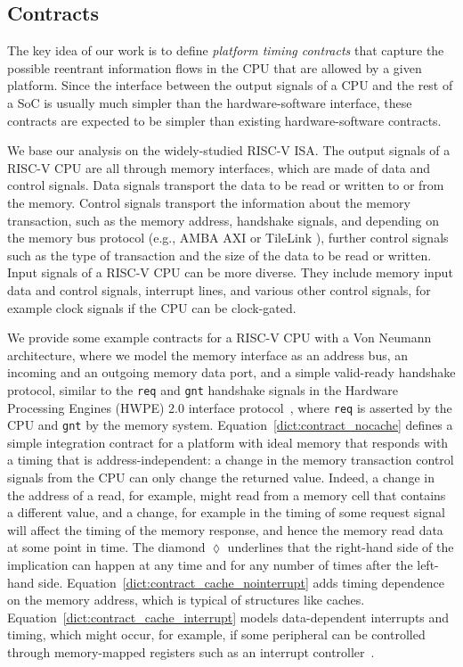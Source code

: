 \subsection{Contracts}

The key idea of our work is to define \emph{platform timing contracts} that capture the possible reentrant information flows in the CPU that are allowed by a given platform.
Since the interface between the output signals of a CPU and the rest of a SoC is usually much simpler than the hardware-software interface, these contracts are expected to be simpler than existing hardware-software contracts.

We base our analysis on the widely-studied RISC-V ISA.
The output signals of a RISC-V CPU are all through memory interfaces, which are made of data and control signals.
Data signals transport the data to be read or written to or from the memory.
Control signals transport the information about the memory transaction, such as the memory address, handshake signals, and depending on the memory bus protocol (e.g., AMBA AXI \cite{arm_amba_axi4} or TileLink \cite{tilelink_spec}), further control signals such as the type of transaction and the size of the data to be read or written.
Input signals of a RISC-V CPU can be more diverse.
They include memory input data and control signals, interrupt lines, and various other control signals, for example clock signals if the CPU can be clock-gated.


We provide some example contracts for a RISC-V CPU with a Von Neumann architecture, where we model the memory interface as an address bus, an incoming and an outgoing memory data port, and a simple valid-ready handshake protocol, similar to the \texttt{req} and \texttt{gnt} handshake signals in the Hardware Processing Engines (HWPE) 2.0 interface protocol~\cite{pulpHWPEMem}, where \texttt{req} is asserted by the CPU and \texttt{gnt} by the memory system.
Equation~\ref{dict:contract_nocache} defines a simple integration contract for a platform with ideal memory that responds with a timing that is address-independent: a change in the memory transaction control signals from the CPU can only change the returned value.
Indeed, a change in the address of a read, for example, might read from a memory cell that contains a different value, and a change, for example in the timing of some request signal will affect the timing of the memory response, and hence the memory read data at some point in time.
The diamond $\lozenge$ underlines that the right-hand side of the implication can happen at any time and for any number of times after the left-hand side.
Equation~\ref{dict:contract_cache_nointerrupt} adds timing dependence on the memory address, which is typical of structures like caches.
Equation~\ref{dict:contract_cache_interrupt} models data-dependent interrupts and timing, which might occur, for example, if some peripheral can be controlled through memory-mapped registers such as an interrupt controller~\cite{riscv_plic_spec_1_0_0}.

